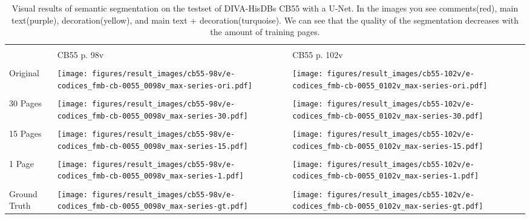 \documentclass[runningheads]{llncs}
\begin{document}
\begin{table}
    \centering
    \caption{Visual results of semantic segmentation on the testset of DIVA-HisDBs CB55 with a U-Net. In the images you see comments(red), main text(purple), decoration(yellow), and main text + decoration(turquoise). We can see that the quality of the segmentation decreases with the amount of training pages.}
    \label{tab:segmentation_results_images}
    \begin{tabular}{ P{0.18\textwidth} | P{0.39\textwidth} P{0.39\textwidth} }
        & &\\
        &  CB55 p. 98v & CB55 p. 102v \\
        \hline
        
        & &\\
        
        \parbox[m]{0.17\textwidth}{ \vspace*{-7em} Original} &
        \texttt{[image: figures/result\_images/cb55-98v/e-codices\_fmb-cb-0055\_0098v\_max-series-ori.pdf]} & \texttt{[image: figures/result\_images/cb55-102v/e-codices\_fmb-cb-0055\_0102v\_max-series-ori.pdf]} \\
        
        & &\\
        \parbox[m]{0.17\textwidth}{ \vspace*{-7em} 30 Pages} &
        \texttt{[image: figures/result\_images/cb55-98v/e-codices\_fmb-cb-0055\_0098v\_max-series-30.pdf]} &
        \texttt{[image: figures/result\_images/cb55-102v/e-codices\_fmb-cb-0055\_0102v\_max-series-30.pdf]} \\
       
        & &\\
        \parbox[m]{0.17\textwidth}{ \vspace*{-7em}15 Pages} &
        \texttt{[image: figures/result\_images/cb55-98v/e-codices\_fmb-cb-0055\_0098v\_max-series-15.pdf]} &
        \texttt{[image: figures/result\_images/cb55-102v/e-codices\_fmb-cb-0055\_0102v\_max-series-15.pdf]}\\
       
        & &\\
        \parbox[m]{0.17\textwidth}{ \vspace*{-7em}1 Page} &
        \texttt{[image: figures/result\_images/cb55-98v/e-codices\_fmb-cb-0055\_0098v\_max-series-1.pdf]} &
        \texttt{[image: figures/result\_images/cb55-102v/e-codices\_fmb-cb-0055\_0102v\_max-series-1.pdf]}\\
      
        & &\\
        \parbox[m]{0.17\textwidth}{ \vspace*{-7em}Ground Truth} &
        \texttt{[image: figures/result\_images/cb55-98v/e-codices\_fmb-cb-0055\_0098v\_max-series-gt.pdf]} &
        \texttt{[image: figures/result\_images/cb55-102v/e-codices\_fmb-cb-0055\_0102v\_max-series-gt.pdf]}\\
        
        \hline
    \end{tabular}
\end{table}
\end{document}
